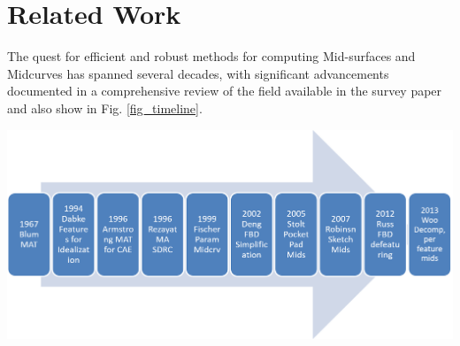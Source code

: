 \documentclass[10pt, conference]{IEEEtran}
\begin{document}

\section{Related Work}
\label{sec:2}

The quest for efficient and robust methods for computing Mid-surfaces and Midcurves has spanned several decades, with significant advancements documented in a comprehensive review of the field available in the survey paper \cite{medial2010} and also show in Fig. \ref{fig_timeline}.

     \begin{center}
	\includegraphics[width=0.8\linewidth]{images/midcurve15}
	\label{fig_timeline}
    \end{center}
    
\end{document}
